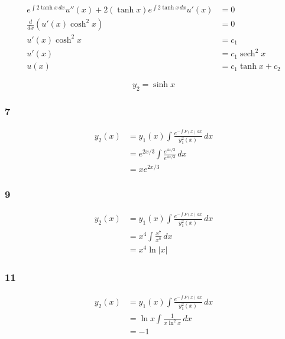 \documentclass{article}
\DeclareMathOperator{\sech}{sech}
\begin{document}
\begin{align*}
  e^{\int 2 \tanh x \,dx} u''(x) + 2 (\tanh x) e^{\int 2 \tanh x \,dx} u'(x) & = 0                 \\
  \frac{d}{dx} (u'(x) \cosh^2 x)                                             & = 0                 \\
  u'(x) \cosh^2 x                                                            & = c_1               \\
  u'(x)                                                                      & = c_1 \sech^2 x     \\
  u(x)                                                                       & = c_1 \tanh x + c_2
\end{align*}

\[y_2 = \sinh x\]

\subsubsection{7}

\begin{align*}
  y_2(x) & = y_1(x) \int \frac{e^{-\int P(x) \,dx}}{y_1^2(x)} \,dx \\
         & = e^{2x / 3} \int \frac{e^{4x / 3}}{e^{4x / 3}} \,dx    \\
         & = x e^{2x / 3}
\end{align*}

\subsubsection{9}

\begin{align*}
  y_2(x) & = y_1(x) \int \frac{e^{-\int P(x) \,dx}}{y_1^2(x)} \,dx \\
         & = x^4 \int \frac{x^7}{x^8} \,dx                         \\
         & = x^4 \ln |x|
\end{align*}

\subsubsection{11}

\begin{align*}
  y_2(x) & = y_1(x) \int \frac{e^{-\int P(x) \,dx}}{y_1^2(x)} \,dx \\
         & = \ln x \int \frac{1}{x \ln^2 x} \,dx                   \\
         & = -1
\end{align*}
\end{document}
